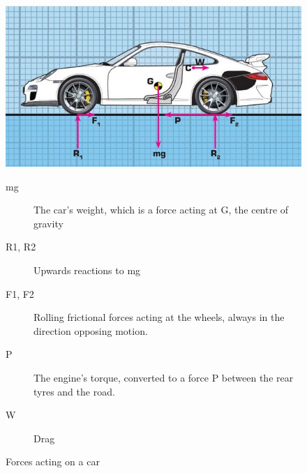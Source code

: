 \begin{figure}[!htb]
	\centering
	\includegraphics[width=\textwidth]{images/forcesoncar}
	\caption{Forces acting on a car\cite{carscienceForces} }
	\begin{description}
		\item[mg] The car’s weight, which is a force acting at G, the centre of gravity
		\item[R1, R2] Upwards reactions to mg
		\item[F1, F2] Rolling frictional forces acting at the wheels, always in the direction opposing motion.
		\item[P] The engine’s torque, converted to a force P between the rear tyres and the road.	
		\item[W] Drag
	\end{description}
	\label{fig:forces-car}
\end{figure}

